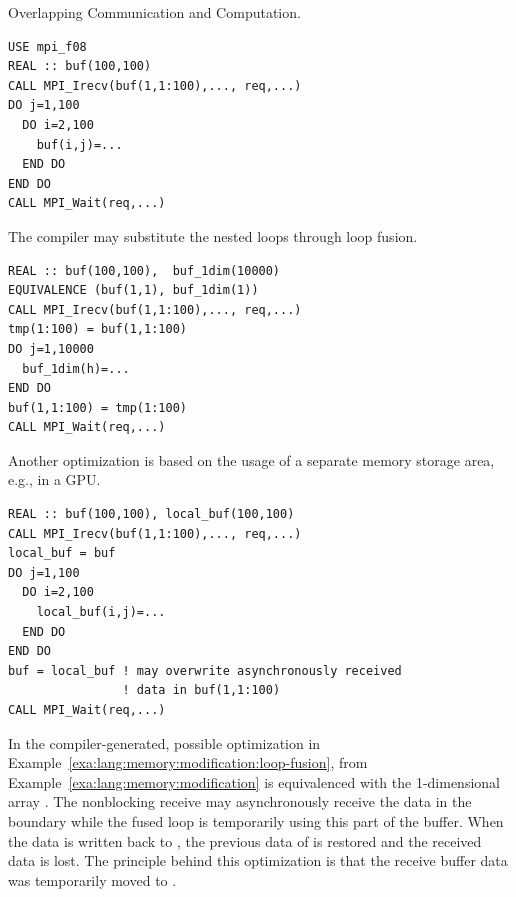 \begin{example}
Overlapping Communication and Computation.
\label{exa:lang:memory:modification}
%
%
\begin{lstlisting}[language={[MPI]Fortran}]
USE mpi_f08
REAL :: buf(100,100)
CALL MPI_Irecv(buf(1,1:100),..., req,...)
DO j=1,100
  DO i=2,100
    buf(i,j)=...
  END DO
END DO
CALL MPI_Wait(req,...)
\end{lstlisting}
\end{example}

\begin{example}
The compiler may substitute the nested loops through loop fusion.
\label{exa:lang:memory:modification:loop-fusion}
%
%
\begin{lstlisting}[language={[MPI]Fortran}]
REAL :: buf(100,100),  buf_1dim(10000)
EQUIVALENCE (buf(1,1), buf_1dim(1))
CALL MPI_Irecv(buf(1,1:100),..., req,...)
tmp(1:100) = buf(1,1:100)
DO j=1,10000
  buf_1dim(h)=...
END DO
buf(1,1:100) = tmp(1:100)
CALL MPI_Wait(req,...)
\end{lstlisting}
\end{example}

\begin{example}
Another optimization is based on the usage of a separate memory storage area, e.g., in a GPU.
\label{exa:lang:memory:modification:local-memory}
%
%
\begin{lstlisting}[language={[MPI]Fortran}]
REAL :: buf(100,100), local_buf(100,100)
CALL MPI_Irecv(buf(1,1:100),..., req,...)
local_buf = buf
DO j=1,100
  DO i=2,100
    local_buf(i,j)=...
  END DO
END DO
buf = local_buf ! may overwrite asynchronously received
                ! data in buf(1,1:100)
CALL MPI_Wait(req,...)
\end{lstlisting}
\end{example}

In the compiler-generated, possible optimization in Example~\ref{exa:lang:memory:modification:loop-fusion},
 from Example~\ref{exa:lang:memory:modification}
is equivalenced with the  1-dimensional array .
The nonblocking receive may asynchronously receive the data in the boundary 
while the fused loop is temporarily using this part of the buffer.
When the  data is written back to ,
the previous data of  is restored
and the received data is lost.
The principle behind this optimization is that
the receive buffer data  was temporarily moved to .

